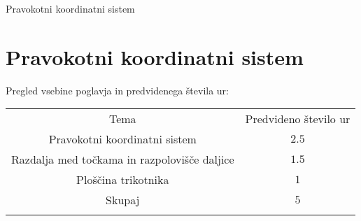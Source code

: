 \begin{priprava}{0}{}{}{Pravokotni koordinatni sistem}{}{}
    
    \chapter{Pravokotni koordinatni sistem}

    \Large{Pregled vsebine poglavja in predvidenega števila ur:}

    \begin{table}[H]
        \centering
        \begin{tabular}{||c|c||} 
        \hhline{|t:==:t|}
        \rowcolor[rgb]{0.843,0.718,0.718} 
        Tema  & Predvideno število ur   \\ 
        \hhline{|:==:|}
        Pravokotni koordinatni sistem & $2.5$    \\ 
        \hline
        Razdalja med točkama in razpolovišče daljice & $1.5$    \\ 
        \hline
        Ploščina  trikotnika & $1$    \\ 
        \hhline{|:==:|}
        Skupaj & $5$     \\
        \hhline{|b:==:b|}
        \end{tabular}
    \end{table}


    
\end{priprava}